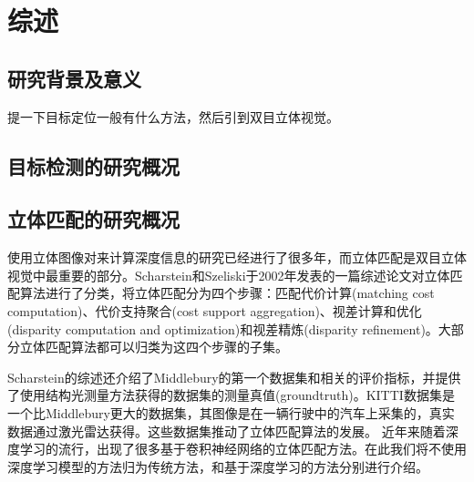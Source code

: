 
\chapter{综述}

\section{研究背景及意义}

提一下目标定位一般有什么方法，然后引到双目立体视觉。

\section{目标检测的研究概况}

\section{立体匹配的研究概况}

使用立体图像对来计算深度信息的研究已经进行了很多年\cite{Barnard:1982:CS:356893.356896}，而立体匹配是双目立体视觉中最重要的部分。Scharstein和Szeliski于2002年发表的一篇综述论文\cite{Scharstein2002}对立体匹配算法进行了分类，将立体匹配分为四个步骤：匹配代价计算(matching cost computation)、代价支持聚合(cost support aggregation)、视差计算和优化(disparity computation and optimization)和视差精炼(disparity refinement)。大部分立体匹配算法都可以归类为这四个步骤的子集。

Scharstein的综述还介绍了Middlebury的第一个数据集和相关的评价指标，并提供了使用结构光测量方法获得的数据集的测量真值(groundtruth)。KITTI数据集\cite{Geiger2012,Menze_2015_CVPR}是一个比Middlebury更大的数据集，其图像是在一辆行驶中的汽车上采集的，真实数据通过激光雷达获得。这些数据集推动了立体匹配算法的发展。
近年来随着深度学习的流行，出现了很多基于卷积神经网络的立体匹配方法。在此我们将不使用深度学习模型的方法归为传统方法，和基于深度学习的方法分别进行介绍。

